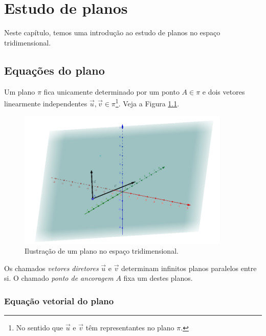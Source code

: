 
\chapter{Estudo de planos}\label{cap_ep}
\thispagestyle{fancy}

Neste capítulo, temos uma introdução ao estudo de planos no espaço tridimensional.

\section{Equações do plano}\label{cap_ep_sec_eqsplano}

Um plano $\pi$ fica unicamente determinado por um ponto $A\in \pi$ e dois vetores linearmente independentes $\vec{u},\vec{v}\in \pi$\footnote{No sentido que $\vec{u}$ e $\vec{v}$ têm representantes no plano $\pi$.}. Veja a Figura \ref{fig:ep_plano}.

\begin{figure}[H]
  \centering
  \includegraphics[width=0.9\textwidth]{cap_ep/dados/fig_ep_plano/fig}
  \caption{Ilustração de um plano no espaço tridimensional.}
  \label{fig:ep_plano}
\end{figure}

Os chamados \emph{vetores diretores} $\vec{u}$ e $\vec{v}$ determinam infinitos planos paralelos entre si. O chamado \emph{ponto de ancoragem} $A$ fixa um destes planos.

\subsection{Equação vetorial do plano}

